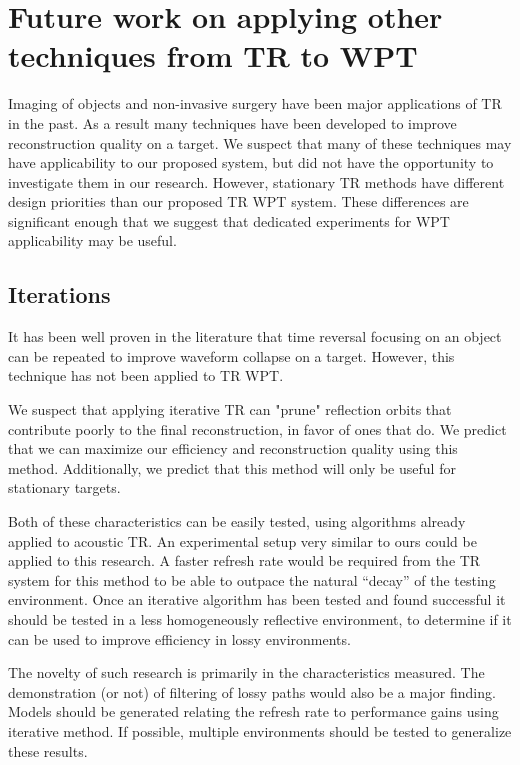\section{Future work on applying other techniques from TR to WPT}
\label{sec:future-tr}
Imaging of objects and non-invasive surgery have been major applications of TR in the past.
As a result  many techniques have been developed to improve reconstruction quality on a target.
We suspect that many of these techniques may have applicability to our proposed system, but did not
have the opportunity to investigate them in our research.
However, stationary TR methods have different design priorities than our proposed TR WPT system.
These differences are significant enough that we suggest that dedicated experiments for WPT applicability may be useful.

\subsection{Iterations}

It has been well proven in the literature that time reversal focusing on an object can be repeated to improve
waveform collapse on a target.   However, this technique has not been applied to TR WPT.

We suspect that applying iterative TR can "prune" reflection orbits that contribute poorly to the final reconstruction, in favor of ones that do. We predict that we can maximize our efficiency and reconstruction quality using this method. Additionally, we predict that this method will only be useful for stationary targets.

Both of these characteristics can be easily tested, using algorithms already applied to acoustic TR. An experimental setup very similar to ours could be applied to this research. A faster refresh rate  would be required from the TR system for this method to be able to outpace the natural ``decay'' of the testing environment. Once an iterative algorithm has been tested and found successful it should be tested in a less homogeneously reflective environment, to determine if it can be used to improve efficiency in lossy environments.

The novelty of such research is primarily in the characteristics measured. The demonstration (or not) of filtering of lossy paths would also be a major finding. Models should be generated relating the refresh rate  to performance gains using iterative method. If possible, multiple environments should be tested to generalize these results.

